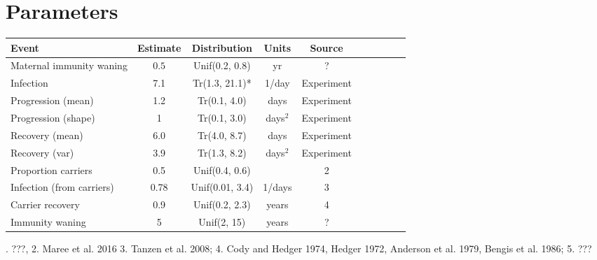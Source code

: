 \documentclass{article}
\begin{document}
\section{Parameters}
\begin{table}[ht]
\centering
\begin{tabular}{l c c c c c l c c c}
\hline\hline
Event & Estimate & Distribution & Units & Source\\ [0.5ex]
\hline %
Maternal immunity waning  & $0.5$ & Unif(0.2, 0.8) & yr & ?\\  %
Infection  & 7.1 & Tr(1.3, 21.1)* & 1/day & Experiment \\
Progression (mean) & 1.2 & Tr(0.1, 4.0) & days & Experiment \\  %
Progression (shape) & 1 & Tr(0.1, 3.0) & days$^2$ & Experiment\\
Recovery (mean) & 6.0 & Tr(4.0, 8.7) &  days & Experiment \\  %
Recovery (var) & 3.9 & Tr(1.3, 8.2) & days$^2$& Experiment  \\  %
Proportion carriers &  0.5 & Unif(0.4, 0.6) &  &  2\\
Infection (from carriers) & 0.78 & Unif(0.01, 3.4) & 1/days & 3\\
Carrier recovery & 0.9 & Unif(0.2, 2.3) & years & 4 \\  
Immunity waning & 5 & Unif(2, 15) & years & ?\\  
\hline
\end{tabular}
\label{table:nonlin}
\end{table}
. ???, 2. Maree et al. 2016  3. Tanzen et al. 2008; 4. Cody and Hedger 1974, Hedger 1972, Anderson et al. 1979, Bengis et al. 1986; 5. ??? \\
\end{document}
